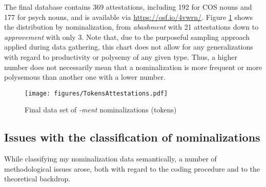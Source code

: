 \noindent The final database contains 369 attestations, including 192 for COS nouns and 177 for psych nouns, and is available via \url{https://osf.io/4vwrn/}. Figure \ref{fig:tokens} shows the distribution by nominalization, from \textit{abashment} with 21 attestations down to \textit{approvement} with only 3. 
Note that, due to the purposeful sampling approach applied during data gathering, this chart does not allow for any generalizations with regard to productivity or polysemy of any given type. Thus, a higher number does not necessarily mean that a nominalization is more frequent or more polysemous than another one with a lower number.

\begin{figure}
\texttt{[image: figures/TokensAttestations.pdf]}
\caption{Final data set of \textit{-ment} nominalizations (tokens)} \label{fig:tokens}
\end{figure} 

\subsection{Issues with the classification of nominalizations}\label{sec:meth-Nsem-issues}\largerpage

While classifying my nominalization data semantically, a number of methodological issues arose, both with regard to the coding procedure and to the theoretical backdrop.

